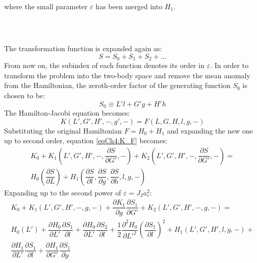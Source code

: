 		\noindent where the small parameter $\varepsilon$ has been merged into $H_1$.
		\subparagraph{  \\}
		\indent The transformation function is expanded again as:
		\[
		S = S_0 + S_1 + S_2 + \ldots
		\]
		\indent From now on, the subindex of each function denotes its order in $\varepsilon$. In order to transform the problem into the two-body space and remove the mean anomaly from the Hamiltonian, the zeroth-order factor of the generating function $S_0$ is chosen to be:
		\[
		S_0 \equiv L' l + G' g + H' h
		\]
		\indent The Hamilton-Jacobi equation becomes:
		\begin{equation}
		K(L', G', H', -, g', -) = F(L, G, H, l, g, -)
		\label{eqCh4:K_F}
		\end{equation}
		\indent Substituting the original Hamiltonian $F = H_0 + H_1$ and expanding the new one up to second order, equation \eqref{eqCh4:K_F} becomes:
		\begin{equation}
		\begin{array}{ll}
		K_0 + K_1\left(L', G', H', -, \dfrac{\partial S}{\partial G'}, -\right) + K_2\left(L', G', H', -, \dfrac{\partial S}{\partial G'}, -\right) = \\[1.2em]
		H_0\left(\dfrac{\partial S}{\partial L} \right) + H_1\left( \dfrac{\partial S}{\partial l}, \dfrac{\partial S}{\partial g}, \dfrac{\partial S}{\partial h}, l, g, - \right)
		\end{array}
		\end{equation}
		\indent Expanding up to the second power of $\varepsilon = J_2 a_e^2$:
		\begin{equation}
		\begin{array}{cc}
		K_0 + K_1\left(L', G', H', -, g, -\right) + \dfrac{\partial K_1}{\partial g} \dfrac{\partial S_1}{\partial G'} + K_2\left(L', G', H', -, g, -\right) = \\[1.2em]
		H_0\left(L' \right) +\dfrac{\partial H_0}{\partial L'} \dfrac{\partial S_1}{\partial l} + \dfrac{\partial H_0}{\partial L'}\dfrac{\partial S_2}{\partial l} + \dfrac{1}{2} \dfrac{\partial^2 H_0}{\partial L'^2} \left( \dfrac{\partial S_1}{\partial l} \right)^2 + H_1\left( L', G', H', l, g, - \right) + \\[1em]
		 \dfrac{\partial H_1}{\partial L'} \dfrac{\partial S_1}{\partial l} + \dfrac{\partial H_1}{\partial G'}\dfrac{\partial S_1}{\partial g}
		\end{array}
		\end{equation}
